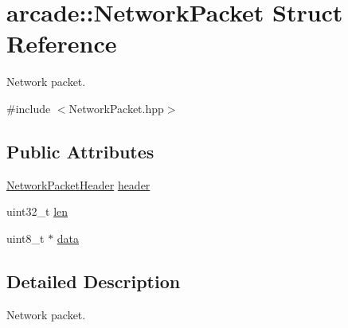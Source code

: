 \hypertarget{structarcade_1_1_network_packet}{\section{arcade\-:\-:Network\-Packet Struct Reference}
\label{structarcade_1_1_network_packet}
}


Network packet.  




{\ttfamily \#include $<$Network\-Packet.\-hpp$>$}

\subsection*{Public Attributes}
\begin{DoxyCompactItemize}
\item 
\hyperlink{structarcade_1_1_network_packet_header}{Network\-Packet\-Header} \hyperlink{structarcade_1_1_network_packet_ad857cd0a4f6387035f4f954ca6d33676}{header}
\item 
uint32\-\_\-t \hyperlink{structarcade_1_1_network_packet_a1f6c07b81a4e7a276d933f326baae6fa}{len}
\item 
uint8\-\_\-t $\ast$ \hyperlink{structarcade_1_1_network_packet_afb76a6c53bfe65517bd668d4e87d77a3}{data}
\end{DoxyCompactItemize}


\subsection{Detailed Description}
Network packet. 

